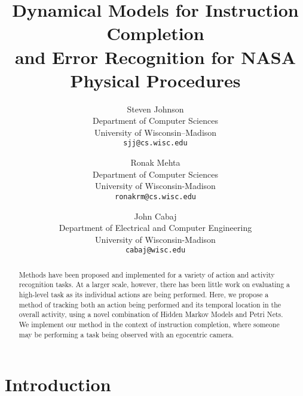 \documentclass[10pt,letterpaper]{article}
\begin{document}
\title{Dynamical Models for Instruction Completion \\and Error Recognition for NASA Physical Procedures}

\author{Steven Johnson\\
Department of Computer Sciences\\
University of Wisconsin--Madison\\
{\tt\small sjj@cs.wisc.edu}
\and
Ronak Mehta\\
Department of Computer Sciences\\
University of Wisconsin-Madison\\
{\tt\small ronakrm@cs.wisc.edu}
\and
John Cabaj\\
Department of Electrical and Computer Engineering\\
University of Wisconsin-Madison\\
{\tt\small cabaj@wisc.edu}
}

\maketitle

\begin{abstract}
Methods have been proposed and implemented for a variety of action and activity recognition tasks. At a larger scale, however, there has been little work on evaluating a high-level task as its individual actions are being performed. Here, we propose a method of tracking both an action being performed and its temporal location in the overall activity, using a novel combination of Hidden Markov Models and Petri Nets. We implement our method in the context of instruction completion, where someone may be performing a task being observed with an egocentric camera.

\end{abstract}

\section{Introduction}
\end{document}
